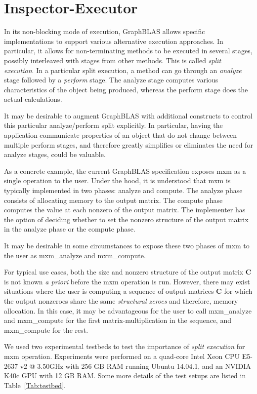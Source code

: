 \section{Inspector-Executor}

In its non-blocking mode of execution, GraphBLAS allows specific implementations to support
various alternative execution approaches. In particular, it allows for non-terminating methods to be 
executed in several stages, possibly interleaved with stages from other methods. This is called \emph{split execution}. In a particular split execution,
a method can go through an \emph{analyze} stage followed by a \emph{perform} stage.
The analyze stage computes various characteristics of the object being produced, whereas the
perform stage does the actual calculations.

It may be desirable to augment GraphBLAS with additional constructs to control this particular
analyze/perform split explicitly. In particular, having the application communicate properties of
an object that do not change between multiple perform stages, and therefore greatly simplifies
or eliminates the need for analyze stages, could be valuable.

As a concrete example, the current GraphBLAS specification exposes {\sf mxm} as a single operation to the user. Under the hood, it is understood that {\sf mxm} is typically implemented in two phases: analyze and compute. The analyze phase consists of allocating memory to the output matrix. The compute phase computes the value at each nonzero of the output matrix. The implementer has the option of deciding whether to set the nonzero structure of the output matrix in the analyze phase or the compute phase.

It may be desirable in some circumstances to expose these two phases of {\sf mxm} to the user as {\sf mxm\_analyze} and {\sf mxm\_compute}. 

For typical use cases, both the size and nonzero structure of the output matrix \textbf{C} is not known \emph{a priori} before the {\sf mxm} operation is run. However, there may exist situations where the user is computing a sequence of output matrices \textbf{C} for which the output nonzeroes share the same \emph{structural zeroes} and therefore, memory allocation. In this case, it may be advantageous for the user to call {\sf mxm\_analyze} and {\sf mxm\_compute} for the first matrix-multiplication in the sequence, and {\sf mxm\_compute} for the rest.

We used two experimental testbeds to test the importance of \emph{split execution} for {\sf mxm} operation. Experiments were performed on a quad-core Intel Xeon CPU E5-2637 v2 @ 3.50GHz with 256 GB RAM running Ubuntu 14.04.1, and an NVIDIA K40c GPU with 12 GB RAM. Some more details of the test setups are listed in Table~\ref{Tab:testbed}.

